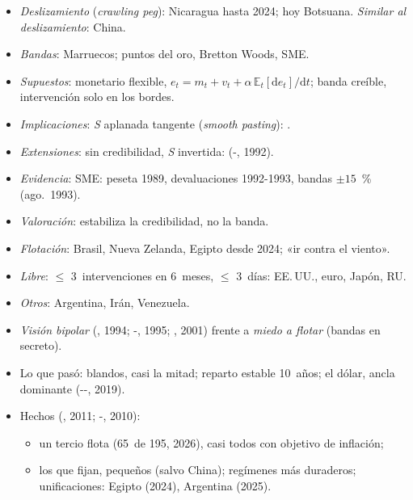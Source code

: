 \documentclass{article}
\begin{document}
\begin{columnas}
\begin{itemize}
\item \emph{Deslizamiento} (\emph{crawling peg}): Nicaragua hasta 2024; hoy Botsuana. \emph{Similar al deslizamiento}: China.
\item \emph{Bandas}: Marruecos; puntos del oro, Bretton Woods, SME.
\end{itemize}
\begin{itemize}
\item \emph{Supuestos}: monetario flexible, $e_t=m_t+v_t+\alpha\,\mathbb{E}_t[\mathrm de_t]/\mathrm dt$; banda creíble, intervención solo en los bordes.
\item \emph{Implicaciones}: \emph{S} aplanada tangente (\emph{smooth pasting}): .
\item \emph{Extensiones}: sin credibilidad, \emph{S} invertida:  (-, 1992).
\item \emph{Evidencia}: SME: peseta 1989, devaluaciones 1992-1993, bandas $\pm15$~\% (ago.\ 1993).
\item \emph{Valoración}: estabiliza la credibilidad, no la banda.
\end{itemize}
\begin{itemize}
\item \emph{Flotación}: Brasil, Nueva Zelanda, Egipto desde 2024; «ir contra el viento».
\item \emph{Libre}: $\leq$ 3~intervenciones en 6~meses, $\leq$ 3~días: EE.\,UU., euro, Japón, RU.
\item \emph{Otros}: Argentina, Irán, Venezuela.
\end{itemize}

\begin{itemize}
\item \emph{Visión bipolar} (, 1994; -, 1995; , 2001) frente a \emph{miedo a flotar} (bandas en secreto).
\item Lo que pasó: blandos, casi la mitad; reparto estable 10~años; el dólar, ancla dominante (--, 2019).
\item Hechos (, 2011; -, 2010):
  \begin{itemize}
  \item un tercio flota (65~de 195, 2026), casi todos con objetivo de inflación;
  \item los que fijan, pequeños (salvo China); regímenes más duraderos; unificaciones: Egipto (2024), Argentina (2025).
  \end{itemize}
\end{itemize}


\end{columnas}
\end{document}
